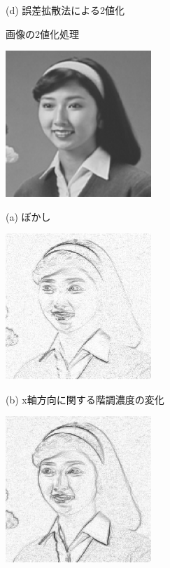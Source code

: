 \begin{figure}[H]
\begin{center}
\begin{minipage}{6cm}
\begin{center}
(d) 誤差拡散法による2値化
\end{center}
\end{minipage}
\end{center}
\caption{画像の2値化処理}
\label{fig:008-06}
\end{figure}

\begin{figure}[H]
\begin{center}
\begin{minipage}{6cm}
\begin{center}
\includegraphics[width=5.5cm]{fig/hair1_bokashi.eps}

(a) ぼかし
\end{center}
\end{minipage}
\begin{minipage}{6cm}
\begin{center}
\includegraphics[width=5.5cm]{fig/hair1_x_sharp.eps}

(b) x軸方向に関する階調濃度の変化
\end{center}
\end{minipage}
\begin{minipage}{6cm}
\begin{center}
\includegraphics[width=5.5cm]{fig/hair1_rinkaku.eps}


\end{center}
\end{minipage}
\end{center}
\end{figure}
